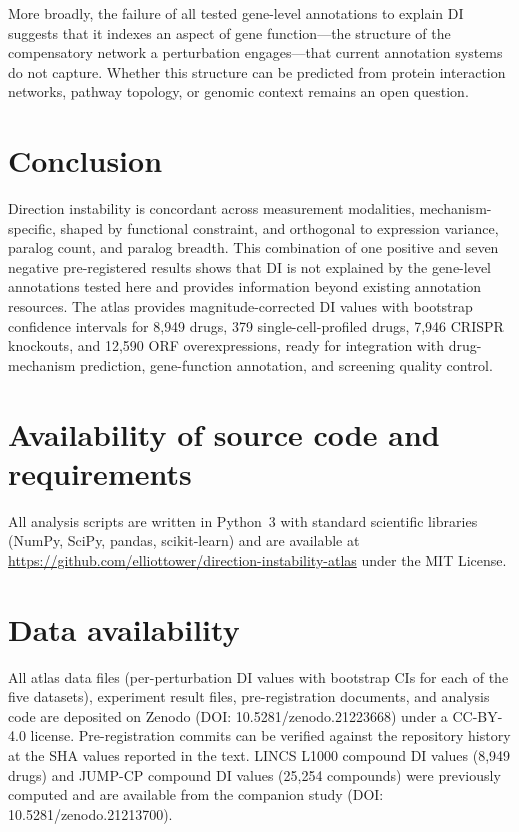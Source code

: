 \documentclass[11pt]{article}
\begin{document}
More broadly, the failure of all tested gene-level annotations to
explain DI suggests that it indexes an aspect of gene function---the
structure of the compensatory network a perturbation engages---that
current annotation systems do not capture.  Whether this structure can
be predicted from protein interaction networks, pathway topology, or
genomic context remains an open question.

\section{Conclusion}

Direction instability is concordant across measurement modalities,
mechanism-specific, shaped by functional constraint, and orthogonal to
expression variance, paralog count, and paralog breadth.  This
combination of one positive and seven negative pre-registered results
shows that DI is not explained by the gene-level annotations tested
here and provides information beyond existing annotation resources.  The
atlas provides magnitude-corrected DI values with bootstrap confidence
intervals for 8{,}949 drugs, 379 single-cell-profiled drugs, 7{,}946
CRISPR knockouts, and 12{,}590 ORF overexpressions, ready for
integration with drug-mechanism prediction, gene-function annotation,
and screening quality control.



\section*{Availability of source code and requirements}

All analysis scripts are written in Python~3 with standard scientific
libraries (NumPy, SciPy, pandas, scikit-learn) and are available at
\url{https://github.com/elliottower/direction-instability-atlas} under
the MIT License.

\section*{Data availability}

All atlas data files (per-perturbation DI values with bootstrap CIs for
each of the five datasets), experiment result files, pre-registration
documents, and analysis code are deposited on Zenodo
(DOI: 10.5281/zenodo.21223668) under a CC-BY-4.0 license.
Pre-registration commits can be verified against the repository history
at the SHA values reported in the text.  LINCS L1000 compound DI values
(8{,}949 drugs) and JUMP-CP compound DI values (25{,}254 compounds)
were previously computed and are available from the companion study
(DOI: 10.5281/zenodo.21213700).
\end{document}
